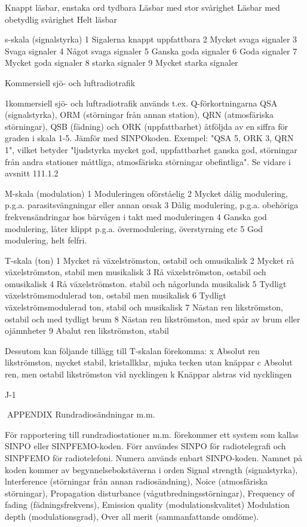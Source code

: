 \documentclass[a4paper,twoside,twocolumn,openright]{book}
\begin{document}
{{{{{{{{{{{Knappt läsbar, enstaka ord tydbara
Läsbar med stor svårighet
Läsbar med obetydlig svårighet
Helt läsbar

s-skala (signalstyrka)
1 Sigalerna knappt uppfattbara
2 Mycket svaga signaler
3 Svaga signaler
4 Något svaga signaler
5 Ganska goda signaler
6 Goda signaler
7 Mycket goda signaler
8 starka signaler
9 Mycket starka signaler

Kommersiell sjö- och luftradiotrafik

1kommersiell sjö- och luftradiotrafik används
t.ex. Q-förkortningarna QSA (signalstyrka),
ORM (störningar från annan station), QRN
(atmosfäriska störningar), QSB (fädning) och
ORK (uppfattbarhet) åtföljda av en siffra för
graden i skala 1-5. Jämför med SINPOkoden.
Exempel:
"QSA 5, ORK 3, QRN 1", vilket betyder
"ljudstyrka mycket god, uppfattbarhet ganska god, störningar från andra stationer
måttliga, atmosfäriska störningar obefintliga".
Se vidare i avsnitt 111.1.2

M-skala (modulation)
1 Moduleringen oförståelig
2 Mycket dålig modulering, p.g.a.
parasitsvängningar eller annan orsak
3 Dålig modulering, p.g.a. obehöriga
frekvensändringar hos bärvågen i takt
med moduleringen
4 Ganska god modulering, låter klippt
p.g.a. övermodulering, överstyrning
etc
5 God modulering, helt felfri.

T-skala (ton)
1 Mycket rå växelströmston, ostabil och omusikalisk
2 Mycket rå växelströmston, stabil men musikalisk
3 Rå växelströmston, ostabil och omusikalisk
4 Rå växelströmston. stabil och någorlunda musikalisk
5 Tydligt växelströmsmodulerad ton, ostabil men musikalisk
6 Tydligt växelströmsmodulerad ton, stabil och musikalisk
7 Nästan ren likströmston, ostabil och med tydligt brum
8 Nästan ren likströmston, med spår av brum eller ojämnheter
9 Abalut ren likströmston, stabil

Dessutom kan följande tillägg till T-skalan förekomma:
x Absolut ren likströmston, mycket stabil, kristallklar, mjuka tecken utan knäppar
c Absolut ren, men ostabil likströmston vid nycklingen
k Knäppar alstras vid nycklingen

J-1

APPENDIX
Rundradiosändningar m.m.

För rapportering till rundradiostationer m.m.
förekommer ett system som kallas SINPO
eller SINPFEMO-koden.
Förr användes SINPO för radiotelegrafi
och SINPFEMO för radiotelefoni. Numera
används enbart SINPO-koden.
Namnet på koden kommer av begynnelsebokstäverna i orden
Signal strength (signalstyrka),
lnterference (störningar från annan radiosändning),
Noice (atmosfäriska störningar),
Propagation disturbance (vågutbredningsstörningar),
Frequency of fading (fädningsfrekvens),
Emission quality (modulationskvalitet)
Modulation depth (modulationsgrad),
Over all merit (sammanfattande omdöme).

}}}}}}}}}}}
\end{document}
